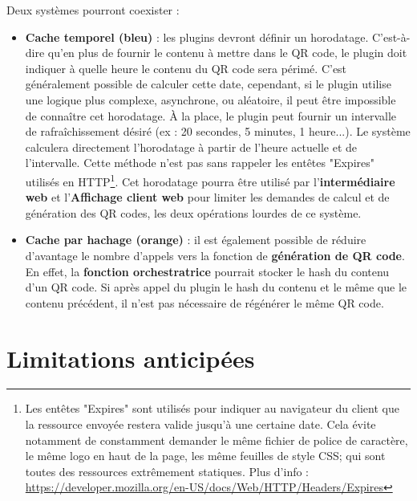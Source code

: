\documentclass[a4paper,12pt]{article}
\begin{document}
Deux systèmes pourront coexister :\\

\begin{itemize}

  \item \textbf{Cache temporel (bleu)} : les plugins devront définir un horodatage. C'est-à-dire qu'en plus de fournir le contenu à mettre dans le QR code, le plugin doit indiquer à quelle heure le contenu du QR code sera périmé. C'est généralement possible de calculer cette date, cependant, si le plugin utilise une logique plus complexe, asynchrone, ou aléatoire, il peut être impossible de connaître cet horodatage. \`A la place, le plugin peut fournir un intervalle de rafraîchissement désiré (ex : 20 secondes, 5 minutes, 1 heure...). Le système calculera directement l'horodatage à partir de l'heure actuelle et de l'intervalle. Cette méthode n'est pas sans rappeler les entêtes "Expires" utilisés en HTTP\footnote{Les entêtes "Expires" sont utilisés pour indiquer au navigateur du client que la ressource envoyée restera valide jusqu'à une certaine date. Cela évite notamment de constamment demander le même fichier de police de caractère, le même logo en haut de la page, les même feuilles de style CSS; qui sont toutes des ressources extrêmement statiques. Plus d'info : \url{https://developer.mozilla.org/en-US/docs/Web/HTTP/Headers/Expires}}. Cet horodatage pourra être utilisé par l'\textbf{intermédiaire web} et l'\textbf{Affichage client web} pour limiter les demandes de calcul et de génération des QR codes, les deux opérations lourdes de ce système.\\
  
  \item \textbf{Cache par hachage (orange)} : il est également possible de réduire d'avantage le nombre d'appels vers la fonction de \textbf{génération de QR code}. En effet, la \textbf{fonction orchestratrice} pourrait stocker le hash du contenu d'un QR code. Si après appel du plugin le hash du contenu et le même que le contenu précédent, il n'est pas nécessaire de régénérer le même QR code.\\
  
\end{itemize}

\iffalse
\section{Limitations anticipées}
\end{document}
